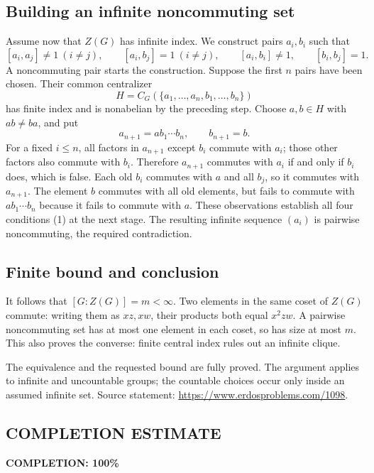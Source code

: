 \subsection*{Building an infinite noncommuting set}
Assume now that $Z(G)$ has infinite index. We construct pairs $a_i,b_i$ such that
\[
 [a_i,a_j]\ne1\ (i\ne j),\qquad
 [a_i,b_j]=1\ (i\ne j),\qquad
 [a_i,b_i]\ne1,\qquad [b_i,b_j]=1.
 \tag{1}
\]
A noncommuting pair starts the construction. Suppose the first $n$ pairs have been chosen. Their common centralizer
\[
 H=C_G(\{a_1,\ldots,a_n,b_1,\ldots,b_n\})
\]
has finite index and is nonabelian by the preceding step. Choose $a,b\in H$ with $ab\ne ba$, and put
\[
 a_{n+1}=a b_1\cdots b_n,\qquad b_{n+1}=b.
\]
For a fixed $i\le n$, all factors in $a_{n+1}$ except $b_i$ commute with $a_i$; those other factors also commute with $b_i$. Therefore $a_{n+1}$ commutes with $a_i$ if and only if $b_i$ does, which is false. Each old $b_i$ commutes with $a$ and all $b_j$, so it commutes with $a_{n+1}$. The element $b$ commutes with all old elements, but fails to commute with $a b_1\cdots b_n$ because it fails to commute with $a$. These observations establish all four conditions (1) at the next stage.
The resulting infinite sequence $(a_i)$ is pairwise noncommuting, the required contradiction.

\subsection*{Finite bound and conclusion}
It follows that $[G:Z(G)]=m<\infty$. Two elements in the same coset of $Z(G)$ commute: writing them as $xz,xw$, their products both equal $x^2zw$. A pairwise noncommuting set has at most one element in each coset, so has size at most $m$. This also proves the converse: finite central index rules out an infinite clique.

The equivalence and the requested bound are fully proved. The argument applies to infinite and uncountable groups; the countable choices occur only inside an assumed infinite set. Source statement: \url{https://www.erdosproblems.com/1098}.
\subsection*{COMPLETION ESTIMATE}
\textbf{COMPLETION: 100\%}
